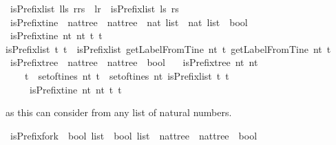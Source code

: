 \begin{isabellebody}
{\isacharbar}\ {\isachardoublequoteopen}isPrefix{\isacharunderscore}list\ {\isacharparenleft}l{\isacharhash}ls{\isacharparenright}\ {\isacharparenleft}r{\isacharhash}rs{\isacharparenright}\ {\isacharequal}\ {\isacharparenleft}{\isacharparenleft}l{\isacharequal}r{\isacharparenright}\ {\isasymand}\ isPrefix{\isacharunderscore}list\ ls\ rs{\isacharparenright}{\isachardoublequoteclose}\isanewline
\ \ \isanewline
{}\isamarkupfalse%
\ isPrefix{\isacharunderscore}tine\ {\isacharcolon}{\isacharcolon}\ {\isachardoublequoteopen}nattree\ {\isasymRightarrow}\ nattree\ {\isasymRightarrow}\ nat\ list\ {\isasymRightarrow}\ nat\ list\ {\isasymRightarrow}\ bool{\isachardoublequoteclose}\ \isanewline
\ {\isachardoublequoteopen}isPrefix{\isacharunderscore}tine\ nt{}\ nt{}\ t{}\ t{}\ {\isacharequal}\ \isanewline
{\isacharparenleft}isPrefix{\isacharunderscore}list\ t{}\ t{}\ {\isasymand}\ isPrefix{\isacharunderscore}list\ {\isacharparenleft}getLabelFromTine\ nt{}\ t{}{\isacharparenright}\ {\isacharparenleft}getLabelFromTine\ nt{}\ t{}{\isacharparenright}{\isacharparenright}{\isachardoublequoteclose}\isanewline
\ \isanewline
{}\isamarkupfalse%
\ isPrefix{\isacharunderscore}tree\ {\isacharcolon}{\isacharcolon}\ {\isachardoublequoteopen}nattree\ {\isasymRightarrow}\ nattree\ {\isasymRightarrow}\ bool{\isachardoublequoteclose}\ \isanewline
\ \ {\isachardoublequoteopen}isPrefix{\isacharunderscore}tree\ nt{}\ nt{}\ {\isacharequal}\isanewline
\ \ \ \ {\isacharparenleft}{\isasymforall}t{}\ {\isasymin}\ set{\isacharunderscore}of{\isacharunderscore}tines\ nt{}{\isachardot}\ {\isasymforall}t{}\ {\isasymin}\ set{\isacharunderscore}of{\isacharunderscore}tines\ nt{}{\isachardot}\ isPrefix{\isacharunderscore}list\ t{}\ t{}\ \isanewline
\ \ \ \ {\isasymlongrightarrow}\ isPrefix{\isacharunderscore}tine\ nt{}\ nt{}\ t{}\ t{}{\isacharparenright}{\isachardoublequoteclose}%
\begin{isamarkuptext}%
as this can consider from any list of natural numbers.%
\end{isamarkuptext}\isamarkuptrue%
\isamarkupfalse%
\ isPrefix{\isacharunderscore}fork\ {\isacharcolon}{\isacharcolon}\ {\isachardoublequoteopen}bool\ list\ {\isasymRightarrow}\ bool\ list\ {\isasymRightarrow}\ nattree\ {\isasymRightarrow}\ nattree\ {\isasymRightarrow}\ bool{\isachardoublequoteclose}\ \isanewline

\end{isabellebody}
